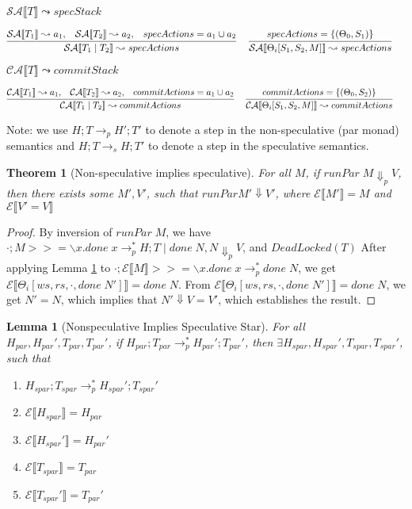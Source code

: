 \documentclass[9pt]{article}
\newtheorem{theorem}{Theorem}
\newtheorem{lemma}{Lemma}
\newcommand\specStep{\rightarrow_{s}}
\newcommand\parStep{\rightarrow_{p}}
\newcommand{\erase}[1]{\mathcal{E}\llbracket #1 \rrbracket}
\newcommand{\specActions}[1]{\mathcal{SA} \llbracket #1 \rrbracket}
\newcommand{\commitActions}[1]{\mathcal{CA} \llbracket #1 \rrbracket}
\begin{document}
$\boxed{\specActions{T} \leadsto specStack} $ 

\[
\infer[]{\specActions{T_1 \; | \; T_2} \leadsto specActions}{\specActions{T_1} \leadsto a_1, \;\;\; \specActions{T_2} \leadsto a_2, \;\;\; specActions = a_1 \cup a_2} \;\;\; 
\infer[]{\specActions{\Theta_i[S_1, S_2, M]} \leadsto specActions}{specActions = \{(\Theta_0, S_1 )\}} \;\;\;
\]

$\boxed{\commitActions{T} \leadsto commitStack} $ 

\[
\infer[]{\commitActions{T_1 \; | \; T_2} \leadsto commitActions}{\commitActions{T_1} \leadsto a_1, \;\;\; \commitActions{T_2} \leadsto a_2, \;\;\; commitActions = a_1 \cup a_2} \;\;\; 
\infer[]{\commitActions{\Theta_i[S_1, S_2, M]} \leadsto commitActions}{commitActions = \{(\Theta_0, S_2 )\}} \;\;\;
\]

Note: we use $H; T \parStep H'; T'$ to denote a step in the non-speculative (par monad) semantics and $H; T \specStep H; T'$ to denote a step in the speculative semantics. 

\begin{theorem}[Non-speculative implies speculative]
For all $M$, if $runPar \; M \Downarrow_p V$, then there exists some $M', V'$, such that $runPar M' \Downarrow V'$, where $\erase{M'} = M$ and $\erase{V' = V}$

\end{theorem}

\begin{proof}

By inversion of $runPar \; M$, we have $\cdot; M >>= \backslash x. done \; x \parStep^* H; T \; | \; done \; N, N \Downarrow_p V$, and $DeadLocked(T)$
After applying Lemma \ref{RunParStar} to $\cdot; \erase{M} >>= \backslash x. done \; x \parStep^* done \; N$, we get $\erase{\Theta_i[ws, rs, \cdot, done \; N']} = done \; N$.  From $\erase{\Theta_i[ws, rs, \cdot, done \; N']} = done \; N$, we get $N' = N$, which implies that $N' \Downarrow V = V'$, which establishes the result.

\end{proof}

\begin{lemma}[Nonspeculative Implies Speculative Star]
\label{RunParStar}
For all $H_{par}, H_{par}', T_{par}, T_{par}'$, if $H_{par}; T_{par} \parStep^* H_{par}'; T_{par}'$, then $\exists H_{spar}, H_{spar}', T_{spar}, T_{spar}'$, such that 
\begin{enumerate}
\item $H_{spar}; T_{spar} \parStep^* H_{spar}'; T_{spar}'$
\item $\erase{H_{spar}} = H_{par}$
\item  $\erase{H_{spar}'} = H_{par}'$
\item $\erase{T_{spar}} = T_{par}$
\item $\erase{T_{spar}'} = T_{par}'$
\end{enumerate}
\end{lemma}
\end{document}
